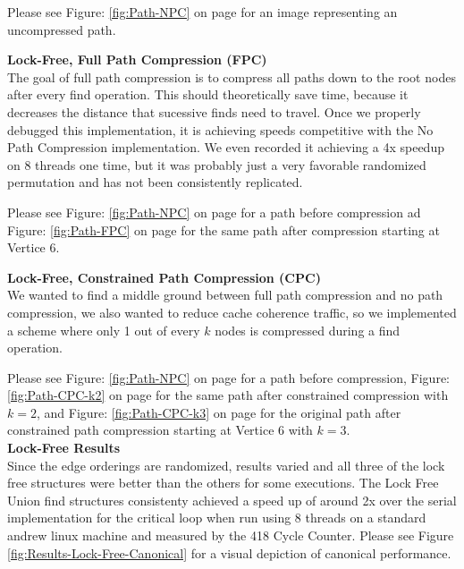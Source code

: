 \documentclass[11pt]{article}
\begin{document}
Please see Figure: \ref{fig:Path-NPC} on page \pageref{fig:Path-NPC} for an image representing an uncompressed path.\\

\newpage

\textbf{Lock-Free, Full Path Compression (FPC)}\\
The goal of full path compression is to compress all paths down to the root nodes after every find operation. This should theoretically save time, because it decreases the distance that sucessive finds need to travel. Once we properly debugged this implementation, it is achieving speeds competitive with the No Path Compression implementation. We even recorded it achieving a 4x speedup on 8 threads one time, but it was probably just a very favorable randomized permutation and has not been consistently replicated.

Please see Figure: \ref{fig:Path-NPC} on page \pageref{fig:Path-NPC} for a path before compression ad Figure: \ref{fig:Path-FPC} on page \pageref{fig:Path-FPC} for the same path after compression starting at Vertice 6.

\textbf{Lock-Free, Constrained Path Compression (CPC)}\\
We wanted to find a middle ground between full path compression and no path compression, we also wanted to reduce cache coherence traffic, so we implemented a scheme where only 1 out of every $k$ nodes is compressed during a find operation.

Please see Figure: \ref{fig:Path-NPC} on page \pageref{fig:Path-NPC} for a path before compression, Figure: \ref{fig:Path-CPC-k2} on page \pageref{fig:Path-CPC-k2} for the same path after constrained compression with $k=2$, and Figure: \ref{fig:Path-CPC-k3} on page \pageref{fig:Path-CPC-k3} for the original path after constrained path compression starting at Vertice 6 with $k=3$.\\


\textbf{Lock-Free Results}\\
Since the edge orderings are randomized, results varied and all three of the lock free structures were better than the others for some executions. The Lock Free Union find structures consistenty achieved a speed up of around 2x over the serial implementation for the critical loop when run using 8 threads on a standard andrew linux machine and measured by the 418 Cycle Counter. Please see Figure \ref{fig:Results-Lock-Free-Canonical} for a visual depiction of canonical performance.\\
\end{document}
